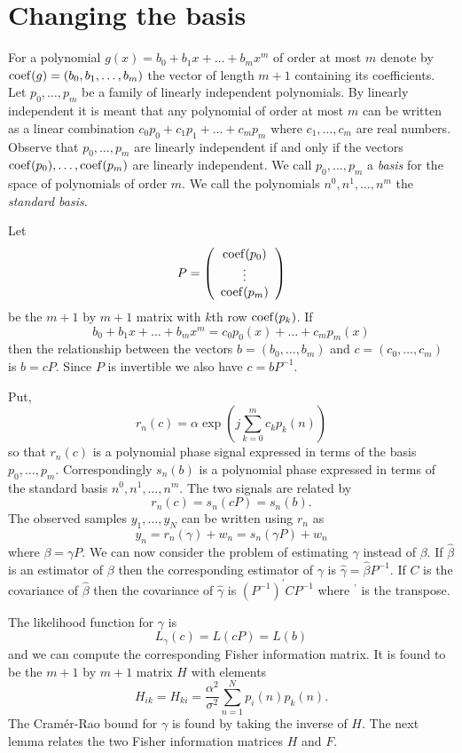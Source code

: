 \documentclass[journal,10pt]{IEEEtran}
\begin{document}
\section{Changing the basis}\label{sec:changing-basis}

\newcommand{\calP}{{\mathcal P}}

For a polynomial $g(x) = b_0 + b_1 x + \dots + b_m x^m$ of order at most $m$ denote by $\operatorname{coef}(g) = (b_0, b_1, \dots, b_m)$ the vector of length $m+1$ containing its coefficients.  Let $p_0, \dots, p_m$ be a family of linearly independent polynomials.  By linearly independent it is meant that any polynomial of order at most $m$ can be written as a linear combination $c_0p_0 + c_1 p_1 + \dots + c_m p_m$ where $c_1, \dots, c_m$ are real numbers.  Observe that $p_0, \dots, p_m$ are linearly independent if and only if the vectors $\operatorname{coef}(p_0), \dots, \operatorname{coef}(p_m)$ are linearly independent.  We call $p_0, \dots, p_m$ a \emph{basis} for the space of polynomials of order $m$.  We call the polynomials $n^0, n^1, \dots, n^m$ the \emph{standard basis}.  

Let 
\[
P = \left( \begin{array}{c}
\operatorname{coef}(p_0) \\
\vdots \\
\operatorname{coef}(p_m)
\end{array} \right)
\] 
be the $m+1$ by $m+1$ matrix with $k$th row $\operatorname{coef}(p_k)$.  If
\[
b_0 + b_1 x + \dots + b_m x^m = c_0 p_0(x) + \dots + c_m p_m(x)
\]
then the relationship between the vectors $b =  (b_0, \dots, b_m)$ and $c =  (c_0, \dots, c_m)$ is $b = cP$.  Since $P$ is invertible we also have $c = bP^{-1}$.

Put,
\[
r_n(c) = \alpha \exp\left( j \sum_{k = 0}^{m}{c_k p_k(n)}\right)
\]
so that $r_n(c)$ is a polynomial phase signal expressed in terms of the basis $p_0, \dots, p_m$.  Correspondingly $s_n(b)$ is a polynomial phase expressed in terms of the standard basis $n^0, n^1, \dots, n^m$.  The two signals are related by
\[
r_n(c) = s_n(cP) = s_n(b).
\]
The observed samples $y_1,\dots,y_N$ can be written using $r_n$ as
\[
y_n = r_n(\gamma) + w_n = s_n(\gamma P) + w_n
\]
where $\beta = \gamma P$.  We can now consider the problem of estimating $\gamma$ instead of $\beta$.  If $\hat{\beta}$ is an estimator of $\beta$ then the corresponding estimator of $\gamma$ is $\hat{\gamma} = \hat{\beta}P^{-1}$.  If $C$ is the covariance of $\hat{\beta}$ then the covariance of $\hat{\gamma}$ is $(P^{-1})^\prime C P^{-1}$ where $^\prime$ is the transpose.

The likelihood function for $\gamma$ is 
\[
L_\gamma(c) = L(cP) = L(b)
\] 
and we can compute the corresponding Fisher information matrix.  It is found to be the $m+1$ by $m+1$ matrix $H$ with elements
\[
H_{ik} = H_{ki} = \frac{\alpha^2}{\sigma^2}\sum_{n=1}^{N} p_{i}(n) p_{k}(n).
\]
The Cram\'{e}r-Rao bound for $\gamma$ is found by taking the inverse of $H$.  The next lemma relates the two Fisher information matrices $H$ and $F$.
\end{document}
